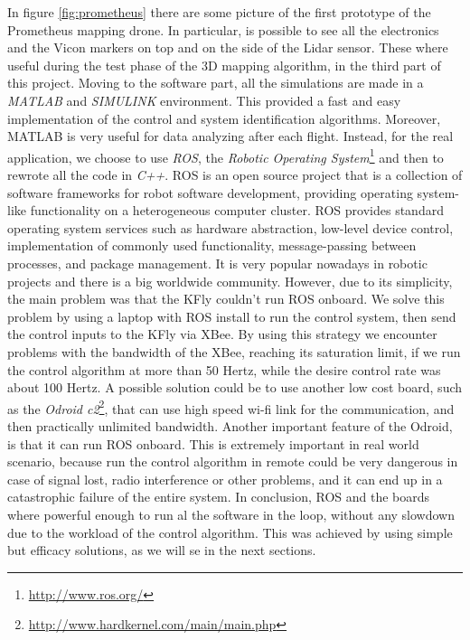 \noindent In figure \ref{fig:prometheus} there are some picture of the first prototype of the Prometheus mapping drone. In particular, is possible to see all the electronics and the Vicon markers on top and on the side of the Lidar sensor. These where useful during the test phase of the 3D mapping algorithm, in the third part of this project. Moving to the software part, all the simulations are made in a \textit{MATLAB} and \textit{SIMULINK} environment. This provided a fast and easy implementation of the control and system identification algorithms. Moreover, MATLAB is very useful for data analyzing after each flight. Instead, for the real application, we choose to use \textit{ROS}, the \textit{Robotic Operating System}\footnote{\url{http://www.ros.org/}} and then to rewrote all the code in \textit{C++}. ROS is an open source project that is a collection of software frameworks for robot software development, providing operating system-like functionality on a heterogeneous computer cluster. ROS provides standard operating system services such as hardware abstraction, low-level device control, implementation of commonly used functionality, message-passing between processes, and package management. It is very popular nowadays in robotic projects and there is a big worldwide community. However, due to its simplicity, the main problem was that the KFly couldn't run ROS onboard. We solve this problem by using a laptop with ROS install to run the control system, then send the control inputs to the KFly via XBee. By using this strategy we encounter problems with the bandwidth of the XBee, reaching its saturation limit, if we run the control algorithm at more than 50 Hertz, while the desire control rate was about 100 Hertz. A possible solution could be to use another low cost board, such as the \textit{Odroid c2}\footnote{\url{http://www.hardkernel.com/main/main.php}}, that can use high speed wi-fi link for the communication, and then practically unlimited bandwidth. Another important feature of the Odroid, is that it can run ROS onboard. This is extremely important in real world scenario, because run the control algorithm in remote could be very dangerous in case of signal lost, radio interference or other problems, and it can end up in a catastrophic failure of the entire system. In conclusion, ROS and the boards where powerful enough to run al the software in the loop, without any slowdown due to the workload of the control algorithm. This was achieved by using simple but efficacy solutions, as we will se in the next sections.   